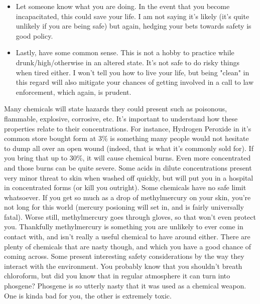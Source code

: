 \documentclass{book}
\begin{document}
\begin{itemize}
\item Let someone know what you are doing.  In the event that you become incapacitated, this could save your life.  I am not saying it's likely (it's quite unlikely if you are being safe) but again, hedging your bets towards safety is good policy.
\item Lastly, have some common sense.  This is not a hobby to practice while drunk/high/otherwise in an altered state.  It's not safe to do risky things when tired either.  I won't tell you how to live your life, but being "clean" in this regard will also mitigate your chances of getting involved in a call to law enforcement, which again, is prudent.
\end{itemize}

Many chemicals will state hazards they could present such as poisonous, flammable, explosive, corrosive, etc.  It's important to understand how these properties relate to their concentrations.  For instance, Hydrogen Peroxide in it's common store bought form at 3\% is something many people would not hesitate to dump all over an open wound (indeed, that is what it's commonly sold for).  If you bring that up to 30\%, it will cause chemical burns.  Even more concentrated and those burns can be quite severe.  Some acids in dilute concentrations present very minor threat to skin when washed off quickly, but will put you in a hospital in concentrated forms (or kill you outright).  Some chemicals have no safe limit whatsoever.  If you get so much as a drop of methylmercury on your skin, you're not long for this world (mercury posioning will set in, and is fairly universally fatal).  Worse still, methylmercury goes through gloves, so that won't even protect you.  Thankfully methylmercury is something you are unlikely to ever come in contact with, and isn't really a useful chemical to have around either.  There are plenty of chemicals that are nasty though, and which you have a good chance of coming across.  Some present interesting safety considerations by the way they interact with the environment.  You probably know that you shouldn't breath chloroform, but did you know that in regular atmosphere it can turn into phosgene?  Phosgene is so utterly nasty that it was used as a chemical weapon.  One is kinda bad for you, the other is extremely toxic.\\
\\
\end{document}
